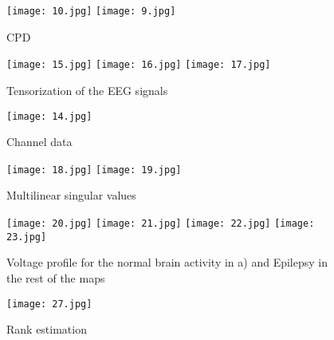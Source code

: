 \begin{figure}[!htbp]
%
\centering
\texttt{[image: 10.jpg]}
\label{a11}
\endminipage\hfill
{}%
\centering
\texttt{[image: 9.jpg]}
\label{a12}
\endminipage\hfill
\caption{CPD}
\end{figure}

\begin{figure}[!htbp]
%
\centering
\texttt{[image: 15.jpg]}
\endminipage\hfill
{}%
\centering
\texttt{[image: 16.jpg]}
\endminipage\hfill
{}%
\centering
\texttt{[image: 17.jpg]}
\endminipage\hfill
\caption{Tensorization of the EEG signals}\label{a16}
\end{figure}

\begin{figure}[!htbp]
\centering
\texttt{[image: 14.jpg]}
\caption{Channel data}\label{a17}

\end{figure}


\begin{figure}[!htbp]
%
\centering
\texttt{[image: 18.jpg]}
\label{a18}
\endminipage\hfill
{}%
\centering
\texttt{[image: 19.jpg]}
\label{a19}
\endminipage\hfill
\caption{Multilinear singular values}
\end{figure}

\begin{figure}[!htbp]
%
\centering
\texttt{[image: 20.jpg]}
\label{a20}
\endminipage\hfill
{}%
\centering
\texttt{[image: 21.jpg]}
\label{a21}
\endminipage\hfill
{}%
\centering
\texttt{[image: 22.jpg]}
\label{a22}
\endminipage\hfill
{}%
\centering
\texttt{[image: 23.jpg]}
\label{a23}
\endminipage\hfill
\caption{Voltage profile for the normal brain activity in a) and Epilepsy in the rest of the maps}\label{a}
\end{figure}


\begin{figure}[!htbp]
\centering
\texttt{[image: 27.jpg]}
\caption{Rank estimation}\label{A2}

\end{figure}